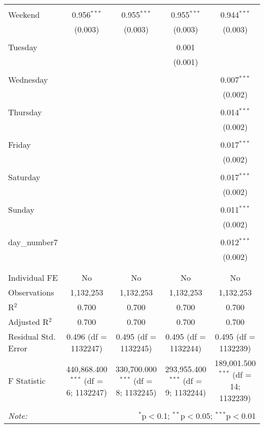 \documentclass[
]{article}
\begin{document}
\begin{table}[!htbp]
{\begin{tabular}{@{\extracolsep{5pt}}lcccc}
  & & & & \\ 
 Weekend & 0.956$^{***}$ & 0.955$^{***}$ & 0.955$^{***}$ & 0.944$^{***}$ \\ 
  & (0.003) & (0.003) & (0.003) & (0.003) \\ 
  & & & & \\ 
 Tuesday &  &  & 0.001 &  \\ 
  &  &  & (0.001) &  \\ 
  & & & & \\ 
 Wednesday &  &  &  & 0.007$^{***}$ \\ 
  &  &  &  & (0.002) \\ 
  & & & & \\ 
 Thursday &  &  &  & 0.014$^{***}$ \\ 
  &  &  &  & (0.002) \\ 
  & & & & \\ 
 Friday &  &  &  & 0.017$^{***}$ \\ 
  &  &  &  & (0.002) \\ 
  & & & & \\ 
 Saturday &  &  &  & 0.017$^{***}$ \\ 
  &  &  &  & (0.002) \\ 
  & & & & \\ 
 Sunday &  &  &  & 0.011$^{***}$ \\ 
  &  &  &  & (0.002) \\ 
  & & & & \\ 
 day\_number7 &  &  &  & 0.012$^{***}$ \\ 
  &  &  &  & (0.002) \\ 
  & & & & \\ 
\hline \\[-1.8ex] 
Individual FE & No & No & No & No \\ 
Observations & 1,132,253 & 1,132,253 & 1,132,253 & 1,132,253 \\ 
R$^{2}$ & 0.700 & 0.700 & 0.700 & 0.700 \\ 
Adjusted R$^{2}$ & 0.700 & 0.700 & 0.700 & 0.700 \\ 
Residual Std. Error & 0.496 (df = 1132247) & 0.495 (df = 1132245) & 0.495 (df = 1132244) & 0.495 (df = 1132239) \\ 
F Statistic & 440,868.400$^{***}$ (df = 6; 1132247) & 330,700.000$^{***}$ (df = 8; 1132245) & 293,955.400$^{***}$ (df = 9; 1132244) & 189,001.500$^{***}$ (df = 14; 1132239) \\ 
\hline 
\hline \\[-1.8ex] 
\textit{Note:}  & \multicolumn{4}{r}{$^{*}$p$<$0.1; $^{**}$p$<$0.05; $^{***}$p$<$0.01} \\ 
\end{tabular}
} 
\end{table} 
\newpage
\end{document}
